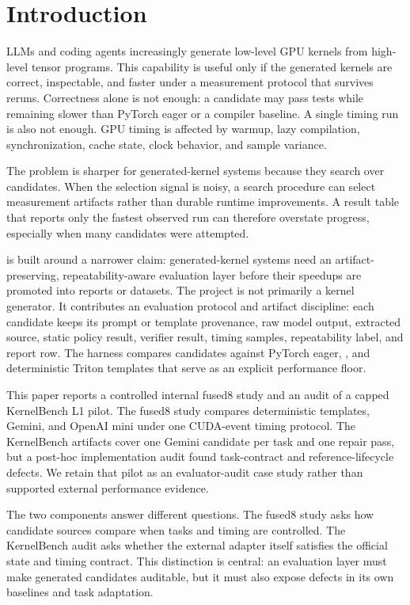 \section{Introduction}

LLMs and coding agents increasingly generate low-level GPU kernels from high-level tensor programs. This capability is useful only if the generated kernels are correct, inspectable, and faster under a measurement protocol that survives reruns. Correctness alone is not enough: a candidate may pass tests while remaining slower than PyTorch eager or a compiler baseline. A single timing run is also not enough. GPU timing is affected by warmup, lazy compilation, synchronization, cache state, clock behavior, and sample variance.

The problem is sharper for generated-kernel systems because they search over candidates. When the selection signal is noisy, a search procedure can select measurement artifacts rather than durable runtime improvements. A result table that reports only the fastest observed run can therefore overstate progress, especially when many candidates were attempted.

\okf{} is built around a narrower claim: generated-kernel systems need an artifact-preserving, repeatability-aware evaluation layer before their speedups are promoted into reports or datasets. The project is not primarily a kernel generator. It contributes an evaluation protocol and artifact discipline: each candidate keeps its prompt or template provenance, raw model output, extracted source, static policy result, verifier result, timing samples, repeatability label, and report row. The harness compares candidates against PyTorch eager, \compile{}, and deterministic Triton templates that serve as an explicit performance floor.

This paper reports a controlled internal fused8 study and an audit of a capped KernelBench L1 pilot. The fused8 study compares deterministic templates, Gemini, and OpenAI mini under one CUDA-event timing protocol. The KernelBench artifacts cover one Gemini candidate per task and one repair pass, but a post-hoc implementation audit found task-contract and reference-lifecycle defects. We retain that pilot as an evaluator-audit case study rather than supported external performance evidence.

The two components answer different questions. The fused8 study asks how candidate sources compare when tasks and timing are controlled. The KernelBench audit asks whether the external adapter itself satisfies the official state and timing contract. This distinction is central: an evaluation layer must make generated candidates auditable, but it must also expose defects in its own baselines and task adaptation.

